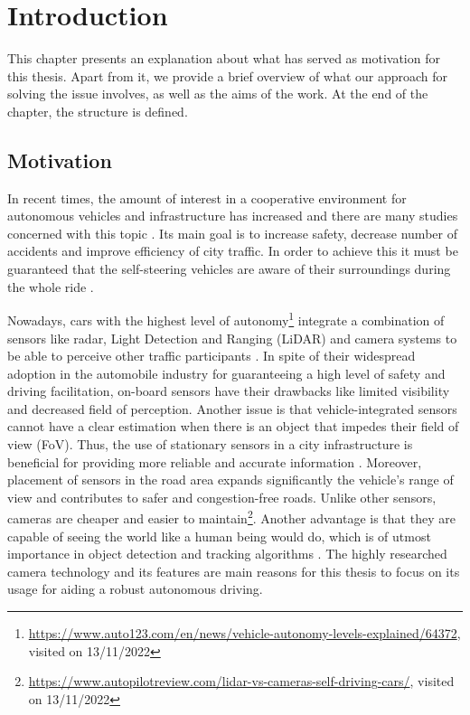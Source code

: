 \chapter{Introduction}
\label{introduction}
This chapter presents an explanation about what has served as motivation for this thesis. Apart from it, we provide a brief overview of what our approach for solving the issue involves, as well as the aims of the work. At the end of the chapter, the structure is defined.

\section{Motivation}
In recent times, the amount of interest in a cooperative environment for autonomous vehicles and infrastructure has increased and there are many studies concerned with this topic \cite{cvis_article_one, cvis_article_two}. Its main goal is to increase safety, decrease number of accidents and improve efficiency of city traffic. In order to achieve this it must be guaranteed that the self-steering vehicles are aware of their surroundings during the whole ride \cite{onboard_sensors}.

Nowadays, cars with the highest level of autonomy\footnote{\url{https://www.auto123.com/en/news/vehicle-autonomy-levels-explained/64372}, visited on 13/11/2022} integrate a combination of sensors like radar, Light Detection and Ranging (LiDAR) and camera systems to be able to perceive other traffic participants \cite{autonomous_cars_sensors}. In spite of their widespread adoption in the automobile industry for guaranteeing a high level of safety and driving facilitation, on-board sensors have their drawbacks like limited visibility and decreased field of perception. Another issue is that vehicle-integrated sensors cannot have a clear estimation when there is an object that impedes their field of view (FoV). Thus, the use of stationary sensors in a city infrastructure is beneficial for providing more reliable and accurate information \cite{roadside_lidar}. Moreover, placement of sensors in the road area expands significantly the vehicle's range of view and contributes to safer and congestion-free roads. Unlike other sensors, cameras are cheaper and easier to maintain\footnote{\url{https://www.autopilotreview.com/lidar-vs-cameras-self-driving-cars/}, visited on 13/11/2022}. Another advantage is that they are capable of seeing the world like a human being would do, which is of utmost importance in object detection and tracking algorithms \cite{camera_object_detection}. The highly researched camera technology and its features are main reasons for this thesis to focus on its usage for aiding a robust autonomous driving.

